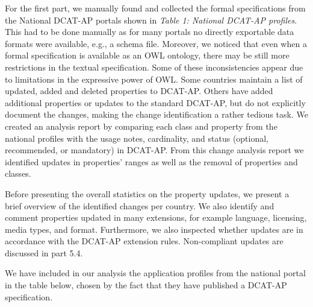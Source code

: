 \documentclass[<options>]{elsarticle}
\begin{document}
For the first part, we manually found and collected the formal specifications from the National DCAT-AP portals shown in \textit{Table 1: National DCAT-AP profiles}. This had to be done manually as for many portals no directly exportable data formats were available, e.g., a schema file. Moreover, we noticed that even when a formal specification is available as an OWL ontology, there may be still more restrictions in the textual specification. Some of these inconsistencies appear due to limitations in the expressive power of OWL. Some countries maintain a list of updated, added and deleted properties to DCAT-AP. Others have added additional properties or updates to the standard DCAT-AP, but do not explicitly document the changes, making the change identification a rather tedious task. We created an analysis report by comparing each class and property from the national profiles with the usage notes, cardinality, and status (optional, recommended, or mandatory) in DCAT-AP. From this change analysis report we identified updates in properties’ ranges as well as the removal of properties and classes.

Before presenting the overall statistics on the property updates, we present a brief overview of the identified changes per country. We also identify and comment properties updated in many extensions, for example language, licensing, media types, and format. Furthermore, we also inspected whether updates are in accordance with the DCAT-AP extension rules. Non-compliant updates are discussed in part 5.4.

We have included in our analysis the application profiles from the national portal in the table below, chosen by the fact that they have published a DCAT-AP specification. 
\\
\\
\\
\end{document}
